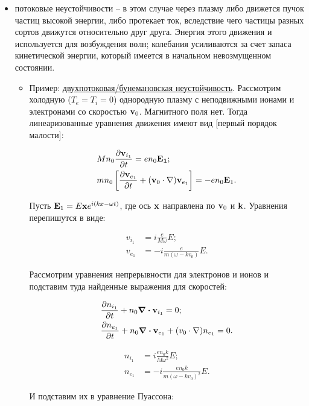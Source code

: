 \documentclass[10pt, a4paper]{article}
\begin{document}
\begin{itemize}
	
	\item потоковые неустойчивости -- в этом случае через плазму либо движется пучок частиц высокой энергии, либо протекает ток, вследствие чего частицы разных сортов движутся относительно друг друга. Энергия этого движения и используется для возбуждения волн; колебания усиливаются за счет запаса кинетической энергии, который имеется в начальном невозмущенном состоянии.
	
	\begin{itemize}
		
		\item Пример: \uline{двухпотоковая/бунемановская неустойчивость}. Рассмотрим холодную ($T_e=T_i=0$) однородную плазму с неподвижными ионами и электронами со скоростью $\vb{v}_0$. Магнитного поля нет. Тогда линеаризованные уравнения движения имеют вид [первый порядок малости]:
		
		\begin{align*}
			&Mn_0\pdv{\vb{v}_{i_1}}{t} = en_0\vb{E_1};\\
			&mn_0\left[\pdv{\vb{v}_{e_1}}{t}+(\vb{v}_0\cdot\nabla)\vb{v}_{e_1}\right] = -en_0\vb{E}_1.
		\end{align*}
	
		Пусть $\vb{E}_1 = E\vb{x}e^{i(kx-\omega t)}$, где ось $\vb{x}$ направлена по $\vb{v}_0$ и $\vb{k}$. Уравнения перепишутся в виде:
		
		\begin{align*}
			v_{i_1} &= i\frac{e}{M\omega}E;\\
			v_{e_1} &= -i\frac{e}{m(\omega-kv_0)}E.
		\end{align*}
	
		Рассмотрим уравнения непрерывности для электронов и ионов и подставим туда найденные выражения для скоростей:
		
		\begin{align*}
			&\pdv{n_{i_1}}{t} + n_0\div{\vb{v}_{i_1}} = 0;\\
			&\pdv{n_{e_1}}{t} + n_0\div{\vb{v}_{e_1}} + (v_0\cdot\nabla) n_{e_1} = 0.
		\end{align*}
	
		\begin{align*}
			n_{i_1} &= i\frac{en_0k}{M\omega^2}E;\\
			n_{e_1} &= -i\frac{en_0k}{m(\omega-kv_0)^2}E.
		\end{align*}
	
		И подставим их в уравнение Пуассона:
		

\end{itemize}
\end{itemize}
\end{document}
